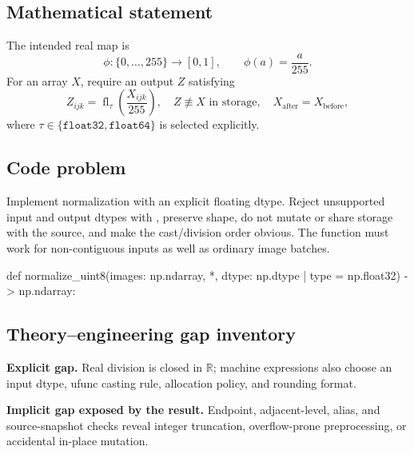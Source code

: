 
        \subsection{Mathematical statement}


The intended real map is
\[
  \phi:\{0,\ldots,255\}\to[0,1],\qquad \phi(a)=\frac{a}{255}.
\]
For an array $X$, require an output $Z$ satisfying
\[
  Z_{ijk}=\operatorname{fl}_{\tau}\!\left(\frac{X_{ijk}}{255}\right),
  \quad Z\not\equiv X\text{ in storage},
  \quad X_{\mathrm{after}}=X_{\mathrm{before}},
\]
where $\tau\in\{\texttt{float32},\texttt{float64}\}$ is selected explicitly.


        \subsection{Code problem}


Implement normalization with an explicit floating dtype.  Reject unsupported
input and output dtypes with , preserve shape, do not mutate
or share storage with the
source, and make the cast/division order obvious.  The function must work for
non-contiguous inputs as well as ordinary image batches.


        \begin{contractbox}
        \begin{Code}
        def normalize_uint8(images: np.ndarray, *, dtype: np.dtype | type = np.float32) -> np.ndarray:
        \end{Code}
        \end{contractbox}

        \subsection{Theory--engineering gap inventory}

        \begin{gapbox}
        \textbf{Explicit gap.} Real division is closed in $\mathbb R$; machine expressions also choose an input dtype, ufunc casting rule, allocation policy, and rounding format.

        \textbf{Implicit gap exposed by the result.} Endpoint, adjacent-level, alias, and source-snapshot checks reveal integer truncation, overflow-prone preprocessing, or accidental in-place mutation.
        \end{gapbox}

